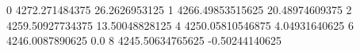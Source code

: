 0 4272.271484375 26.2626953125
1 4266.49853515625 20.48974609375
2 4259.50927734375 13.50048828125
4 4250.05810546875 4.04931640625
6 4246.0087890625 0.0
8 4245.50634765625 -0.50244140625
